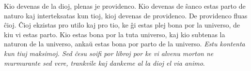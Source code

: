 Kio devenas de la dioj, plenas je providenco. Kio devenas de ŝanco estas parto de naturo kaj interteksatas kun tioj, kioj devenas de providenco. De providenco fluas ĉioj. Ĉioj ekzistas pro utilo kaj pro tio, ke ĝi estas plej bona por la universo, de kiu vi estas parto. Kio estas bona por la tuta universo, kaj kio subtenas la naturon de la universo, ankaŭ estas bona por parto de la universo. \emph{Estu kontenta kun tiuj maksimoj. Sed ĉesu soifi por libroj por ke vi alvenu morton ne murmurante sed vere, trankvile kaj dankeme al la dioj el via animo}.

\bye
